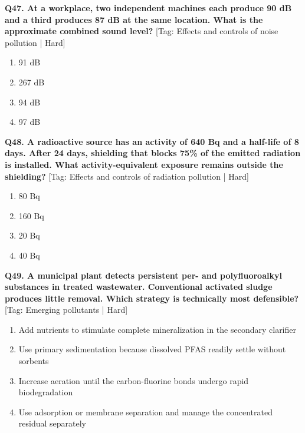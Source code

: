 \noindent\textbf{Q47. At a workplace, two independent machines each produce 90 dB and a third produces 87 dB at the same location. What is the approximate combined sound level?} \hfill [Tag: Effects and controls of noise pollution | Hard]
\begin{enumerate}[label=(\alph*),topsep=2pt,itemsep=1pt,partopsep=0pt,parsep=0pt]
    \item {91 dB}
    \item {267 dB}
    \item {94 dB}
    \item {97 dB}
\end{enumerate}
\vspace{2mm}

\noindent\textbf{Q48. A radioactive source has an activity of 640 Bq and a half-life of 8 days. After 24 days, shielding that blocks 75\% of the emitted radiation is installed. What activity-equivalent exposure remains outside the shielding?} \hfill [Tag: Effects and controls of radiation pollution | Hard]
\begin{enumerate}[label=(\alph*),topsep=2pt,itemsep=1pt,partopsep=0pt,parsep=0pt]
    \item {80 Bq}
    \item {160 Bq}
    \item {20 Bq}
    \item {40 Bq}
\end{enumerate}
\vspace{2mm}

\noindent\textbf{Q49. A municipal plant detects persistent per- and polyfluoroalkyl substances in treated wastewater. Conventional activated sludge produces little removal. Which strategy is technically most defensible?} \hfill [Tag: Emerging pollutants | Hard]
\begin{enumerate}[label=(\alph*),topsep=2pt,itemsep=1pt,partopsep=0pt,parsep=0pt]
    \item {Add nutrients to stimulate complete mineralization in the secondary clarifier}
    \item {Use primary sedimentation because dissolved PFAS readily settle without sorbents}
    \item {Increase aeration until the carbon-fluorine bonds undergo rapid biodegradation}
    \item {Use adsorption or membrane separation and manage the concentrated residual separately}
\end{enumerate}
\vspace{2mm}

